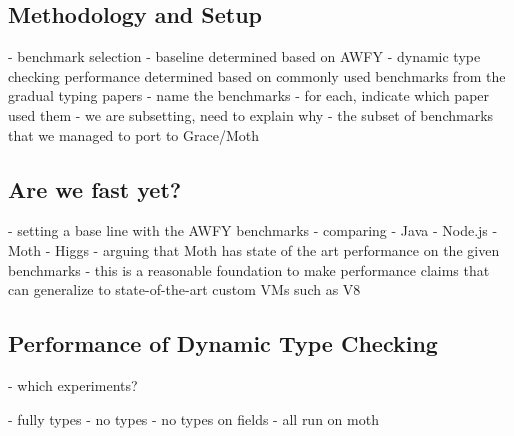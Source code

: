 
\subsection{Methodology and Setup}

\begin{cnote}
- benchmark selection
 - baseline determined based on AWFY
 - dynamic type checking performance determined based on commonly used
   benchmarks from the gradual typing papers
   - name the benchmarks
   - for each, indicate which paper used them
   - we are subsetting, need to explain why
     - the subset of benchmarks that we managed to port to Grace/Moth
\end{cnote}

\subsection{Are we fast yet?}

\begin{cnote}
- setting a base line with the AWFY benchmarks
- comparing
  - Java
  - Node.js
  - Moth
  - Higgs
- arguing that Moth has state of the art performance on the given benchmarks
- this is a reasonable foundation to make performance claims
  that can generalize to state-of-the-art custom VMs such as V8
\end{cnote}

\subsection{Performance of Dynamic Type Checking}

\begin{cnote}
  - which experiments?
  
  - fully types
  - no types
  - no types on fields
  - all run on moth

\end{cnote}

